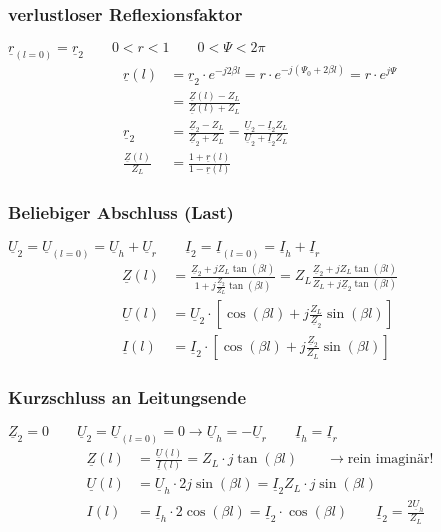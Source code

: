 \subsubsection{verlustloser Reflexionsfaktor}
$ \underline{r}_{(l=0)} = \underline{r}_2 \qquad 0<r<1 \qquad 0<\Psi<2\pi $
\begin{align*}
	\underline{r}(l)  &= \underline{r}_2 \cdot e^{-j2\beta l} = r \cdot e^{-j(\Psi_0+2\beta l)} =r\cdot e^{j\Psi} \\ &=\tfrac{\underline{Z}(l)-Z_L}{\underline{Z}(l)+Z_L}\\
	\underline{r}_2 & = \tfrac{\underline{Z}_2-Z_L}{\underline{Z}_2+Z_L} = \tfrac{\underline{U}_2-\underline{I}_2Z_L}{\underline{U}_2 +\underline{I}_2 Z_L}\\
	\tfrac{\underline{Z}(l)}{Z_L} & = \tfrac{1+\underline{r}(l)}{1-\underline{r}(l)}
\end{align*}
\subsubsection{Beliebiger Abschluss (Last)} \label{beliebig_abschluss}
$\underline{U}_2 = \underline{U}_{(l=0)} =  \underline{U}_h  +\underline{U}_r \qquad \underline{I}_2 = \underline{I}_{(l=0)} =  \underline{I}_h  +\underline{I}_r $	
\begin{align*}
	\underline{Z}(l) & = 
	\frac{\underline{Z}_2+jZ_L\tan(\beta 
	l)}{1+ j \frac{\underline{Z}_2}{Z_L}\tan(\beta l)}
	= Z_L \frac{\underline{Z}_2 + j Z_L \tan(\beta l)}{Z_L + j \underline{Z}_2 \tan(\beta l)}\\
	\underline{U}(l) & = \underline{U}_2 \cdot \left[ \cos(\beta l) + j \tfrac{Z_L}{\underline{Z}_2} \sin(\beta l) \right] \\
	\underline{I}(l) & = \underline{I}_2 \cdot \left[ \cos(\beta l) + j \tfrac{\underline{Z}_2}{Z_L} \sin(\beta l) \right] 
\end{align*}

\subsubsection{Kurzschluss an Leitungsende}
$ \underline{Z}_2 = 0 \qquad \underline{U}_2 = \underline{U}_{(l=0)} = 0 \rightarrow \underline{U}_h = - \underline{U}_r \qquad \underline{I}_h = \underline{I}_r $
\begin{align*}
	\underline{Z}(l)         & = \frac{\underline{U}(l)}{\underline{I}(l)} =  Z_L\cdot j\tan(\beta l)        \qquad \rightarrow \text{rein imaginär!}                      \\
	\underline{U}(l) & =  \underline{U}_h  \cdot 2j\sin(\beta l) = \underline{I}_2 Z_L \cdot j\sin(\beta l)\\
	I(l)         & = \underline{I}_h \cdot 2 \cos(\beta l) =\underline{I}_2 \cdot \cos(\beta l) \qquad \underline{I}_2 =\frac{2\underline{U}_h}{Z_L} \\
\end{align*}

